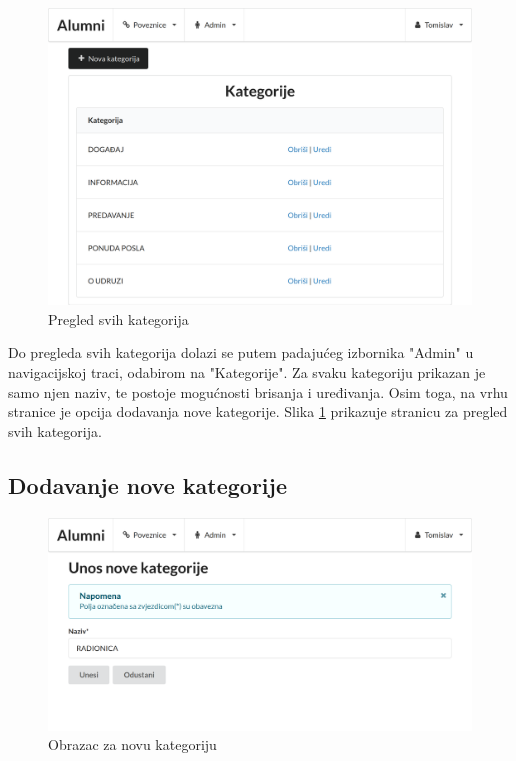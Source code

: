 \documentclass[zavrsni, numeric]{fer}
\begin{document}
\begin{figure}[H]
	\centering
	\includegraphics[width=13cm]{slike/kategorije.png}
	\caption{Pregled svih kategorija}
	\label{fig:kategorije}
\end{figure}

Do pregleda svih kategorija dolazi se putem padajućeg izbornika "Admin" u navigacijskoj traci, odabirom na "Kategorije". Za svaku kategoriju prikazan je samo njen naziv, te postoje mogućnosti brisanja i uređivanja. Osim toga, na vrhu stranice je opcija dodavanja nove kategorije. Slika \ref{fig:kategorije} prikazuje stranicu za pregled svih kategorija.

\subsection{Dodavanje nove kategorije}

\begin{figure}[H]
	\centering
	\includegraphics[width=13cm]{slike/nova-kategorija.png}
	\caption{Obrazac za novu kategoriju}
	\label{fig:nova-kategorija}
\end{figure}
\end{document}

